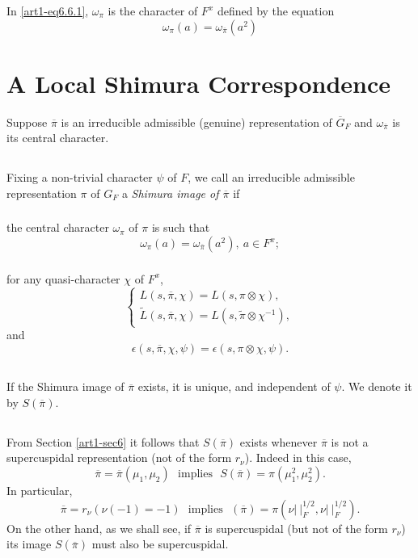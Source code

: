 In \eqref{art1-eq6.6.1}, $\omega_{\pi}$ is the character of $F^{x}$ defined by the equation
\begin{equation}
\omega_{\pi}(a)=\omega_{\overline{\pi}}(a^{2})\label{art1-eq6.6.2}
\end{equation}

\section{A Local Shimura Correspondence}\label{art1-sec7}

Suppose $\overline{\pi}$ is an irreducible admissible (genuine) representation of $\overline{G}_{F}$ and $\omega_{\overline{\pi}}$ is its central character.

\subsection{}\label{art1-sec7.1}\pageoriginale
Fixing a non-trivial character $\psi$ of $F$, we call an irreducible admissible representation $\pi$ of $G_{F}$ a {\em Shimura image of $\overline{\pi}$} if

\subsubsection{}\label{art1-sec7.1.1}
the central character $\omega_{\pi}$ of $\pi$ is such that
$$
\omega_{\pi}(a)=\omega_{\overline{\pi}}(a^{2}), \ a\in F^{x};
$$

\subsubsection{}\label{art1-sec7.1.2}
for any quasi-character $\chi$ of $F^{x}$,
$$
\begin{cases}
L(s,\overline{\pi},\chi)=L(s,\pi\otimes \chi),\\
\widetilde{L}(s,\overline{\pi},\chi)=L(s,\widetilde{\pi}\otimes \chi^{-1}),
\end{cases}
$$
and
$$
\epsilon(s,\overline{\pi},\chi,\psi)=\epsilon(s,\pi\otimes \chi,\psi).
$$

\subsection{}\label{art1-sec7.2}
If the Shimura image of $\overline{\pi}$ exists, it is unique, and independent of $\psi$. We denote it by $S(\overline{\pi})$.

\subsection{}\label{art1-sec7.3}
From Section \ref{art1-sec6} it follows that $S(\overline{\pi})$ exists whenever $\overline{\pi}$ is not a supercuspidal representation (not of the form $r_{\nu}$). Indeed in this case,
$$
\overline{\pi}=\overline{\pi}(\mu_{1},\mu_{2})\text{~ implies~ } S(\overline{\pi})=\pi(\mu^{2}_{1},\mu^{2}_{2}).
$$
In particular,
$$
\overline{\pi}=r_{\nu}(\nu(-1)=-1)\text{~ implies~ } (\overline{\pi})=\pi(\nu|~|^{1/2}_{F},\nu|~|_{F}^{1/2}).
$$
On the other hand, as we shall see, if $\overline{\pi}$ is supercuspidal (but not of the form $r_{\nu}$) its image $S(\overline{\pi})$ must also be supercuspidal.

